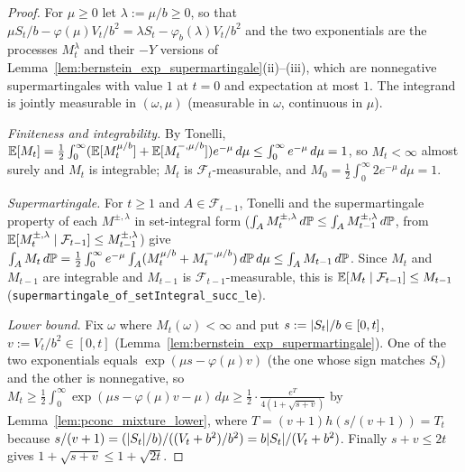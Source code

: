 \begin{proof}
\leanok
For $\mu \ge 0$ let $\lambda := \mu/b \ge 0$, so that $\mu S_t/b - \varphi(\mu)V_t/b^2 = \lambda S_t - \varphi_b(\lambda)V_t/b^2$
and the two exponentials are the processes $M^{\lambda}_t$ and their $-Y$ versions of
Lemma~\ref{lem:bernstein_exp_supermartingale}(ii)--(iii), which are nonnegative supermartingales
with value $1$ at $t = 0$ and expectation at most $1$. The integrand is jointly measurable in
$(\omega, \mu)$ (measurable in $\omega$, continuous in $\mu$).

\emph{Finiteness and integrability.} By Tonelli,
$\mathbb{E}[M_t] = \frac12\int_0^\infty (\mathbb{E}[M^{\mu/b}_t] + \mathbb{E}[M^{-,\mu/b}_t]) e^{-\mu}\,d\mu \le \int_0^\infty e^{-\mu}\, d\mu = 1$,
so $M_t < \infty$ almost surely and $M_t$ is integrable; $M_t$ is $\mathcal F_t$-measurable, and
$M_0 = \frac12\int_0^\infty 2 e^{-\mu}\,d\mu = 1$.

\emph{Supermartingale.} For $t \ge 1$ and $A \in \mathcal F_{t-1}$, Tonelli and the supermartingale
property of each $M^{\pm, \lambda}$ in set-integral form ($\int_A M^{\pm,\lambda}_t\, d\mathbb{P} \le \int_A M^{\pm,\lambda}_{t-1}\, d\mathbb{P}$,
from $\mathbb{E}[M^{\pm,\lambda}_t \mid \mathcal F_{t-1}] \le M^{\pm,\lambda}_{t-1}$) give
$\int_A M_t\, d\mathbb{P} = \frac12 \int_0^\infty e^{-\mu} \int_A (M^{\mu/b}_t + M^{-,\mu/b}_t)\, d\mathbb{P}\, d\mu \le \int_A M_{t-1}\, d\mathbb{P}$.
Since $M_t$ and $M_{t-1}$ are integrable and $M_{t-1}$ is $\mathcal F_{t-1}$-measurable, this is
$\mathbb{E}[M_t \mid \mathcal F_{t-1}] \le M_{t-1}$ (\texttt{supermartingale\_of\_setIntegral\_succ\_le}).

\emph{Lower bound.} Fix $\omega$ where $M_t(\omega) < \infty$ and put $s := \lvert S_t \rvert/b \in [0, t]$,
$v := V_t/b^2 \in [0, t]$ (Lemma~\ref{lem:bernstein_exp_supermartingale}). One of the two
exponentials equals $\exp(\mu s - \varphi(\mu) v)$ (the one whose sign matches $S_t$) and the other
is nonnegative, so $M_t \ge \frac12 \int_0^\infty \exp(\mu s - \varphi(\mu) v - \mu)\, d\mu \ge \frac12 \cdot \frac{e^{T}}{4(1 + \sqrt{s + v})}$
by Lemma~\ref{lem:pconc_mixture_lower}, where $T = (v + 1)h(s/(v + 1)) = T_t$ because
$s/(v + 1) = (\lvert S_t \rvert/b)/((V_t + b^2)/b^2) = b\lvert S_t \rvert/(V_t + b^2)$. Finally $s + v \le 2t$ gives
$1 + \sqrt{s + v} \le 1 + \sqrt{2t}$.
\end{proof}


